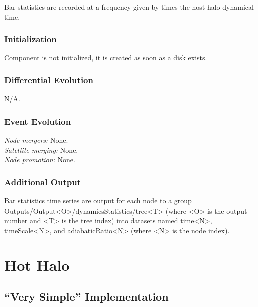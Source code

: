 Bar statistics are recorded at a frequency given by {\normalfont \ttfamily [dynamicsStatisticsBarsFrequency]} times the host halo dynamical time.

\subsubsection{Initialization}

Component is not initialized, it is created as soon as a disk exists.

\subsubsection{Differential Evolution}

N/A.

\subsubsection{Event Evolution}

\noindent\emph{Node mergers:} None.\\

\noindent\emph{Satellite merging:} None.\\

\noindent\emph{Node promotion:} None.\\

\subsubsection{Additional Output}

Bar statistics time series are output for each node to a group {\normalfont \ttfamily Outputs/Output\textless O\textgreater/dynamicsStatistics/tree\textless T\textgreater} (where {\normalfont \ttfamily \textless O\textgreater} is the output number and {\normalfont \ttfamily \textless T\textgreater} is the tree index) into datasets named {\normalfont \ttfamily time\textless N\textgreater}, {\normalfont \ttfamily timeScale\textless N\textgreater}, and {\normalfont \ttfamily adiabaticRatio\textless N\textgreater} (where {\normalfont \ttfamily \textless N\textgreater} is the node index).

\section{Hot Halo}

\subsection{``Very Simple'' Implementation}

